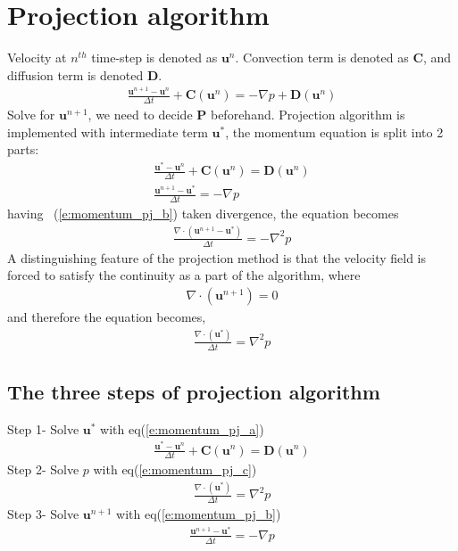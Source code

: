 \documentclass[11pt,dvips]{article}
\numberwithin{equation}{section}
\begin{document}
\section{Projection algorithm}
Velocity at $n^{th}$ time-step is denoted as $\mathbf{u}^n$. Convection term is 
denoted as $\mathbf{C}$, and diffusion term is denoted $\mathbf{D}$.
%
\begin{align}
\frac{\mathbf{u}^{n+1}-\mathbf{u}^{n}}{\Delta t}+\mathbf{C}(\mathbf{u}^{n})=
-\nabla p+\mathbf{D}(\mathbf{u}^{{n}}) \label{e:momentum_pj} 
\end{align}
%
Solve for $\mathbf{u}^{n+1}$, we need to decide $\mathbf{P}$ beforehand. Projection 
algorithm is implemented with intermediate term $\mathbf{u}^{*}$, the momentum 
equation is split into 2 parts: 
%
\begin{gather}
\frac{\mathbf{u}^{*}-\mathbf{u}^{n}}{\Delta t}+\mathbf{C}(\mathbf{u}^{n})=
\mathbf{D}(\mathbf{u}^{{n}})  \label{e:momentum_pj_a}  \\
\frac{\mathbf{u}^{n+1}-\mathbf{u}^{*}}{\Delta t}=-\nabla p \label{e:momentum_pj_b}
\end{gather}
%
having ~(\ref{e:momentum_pj_b}) taken divergence, the equation becomes
%
\begin{align}
\frac{\nabla \cdot(\mathbf{u}^{n+1}-\mathbf{u}^{*})}{\Delta t}=-\nabla ^2 p
\label{e:div_momentum_pj_b}
\end{align}
%
A distinguishing feature of the projection method is that the velocity field is 
forced to satisfy the continuity as a part of the algorithm, where
%
\begin{align}
\nabla \cdot(\mathbf{u}^{n+1})=0 \label{e:continuity_pj}
\end{align}
%
and therefore  the equation becomes, 
%
\begin{align}
\frac{\nabla \cdot(\mathbf{u}^{*})}{\Delta t}=\nabla ^2 p \label{e:momentum_pj_c}
\end{align}
%
\subsection{The three steps of projection algorithm}
Step 1- Solve $\mathbf{u}^{*}$ with eq(\ref{e:momentum_pj_a})
%
\begin{align}
\frac{\mathbf{u}^{*}-\mathbf{u}^{n}}{\Delta t}+\mathbf{C}(\mathbf{u}^{n})=
\mathbf{D}(\mathbf{u}^{{n}})  \nonumber
\end{align}
%
Step 2- Solve $p$ with eq(\ref{e:momentum_pj_c})
%
\begin{align}
\frac{\nabla \cdot(\mathbf{u}^{*})}{\Delta t}=\nabla ^2 p \nonumber
\end{align}
%
Step 3- Solve $\mathbf{u}^{n+1}$  with eq(\ref{e:momentum_pj_b})
%
\begin{align}
\frac{\mathbf{u}^{n+1}-\mathbf{u}^{*}}{\Delta t}=-\nabla p \nonumber
\end{align}
%
\end{document}
